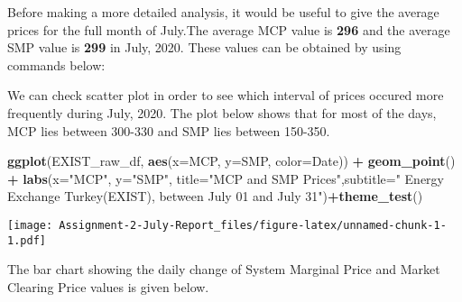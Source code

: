\documentclass[
]{article}
\newenvironment{Shaded}{\begin{snugshade}}{\end{snugshade}}
\newcommand{\DataTypeTok}[1]{\textcolor[rgb]{0.13,0.29,0.53}{#1}}
\newcommand{\KeywordTok}[1]{\textcolor[rgb]{0.13,0.29,0.53}{\textbf{#1}}}
\newcommand{\NormalTok}[1]{#1}
\newcommand{\OperatorTok}[1]{\textcolor[rgb]{0.81,0.36,0.00}{\textbf{#1}}}
\newcommand{\StringTok}[1]{\textcolor[rgb]{0.31,0.60,0.02}{#1}}
\begin{document}
Before making a more detailed analysis, it would be useful to give the
average prices for the full month of July.The average MCP value is
\textbf{296} and the average SMP value is \textbf{299} in July, 2020.
These values can be obtained by using commands below:

\begin{Shaded}
\end{Shaded}

We can check scatter plot in order to see which interval of prices
occured more frequently during July, 2020. The plot below shows that for
most of the days, MCP lies between 300-330 and SMP lies between 150-350.

\begin{Shaded}
\begin{Highlighting}[]
\KeywordTok{ggplot}\NormalTok{(EXIST\_raw\_df, }\KeywordTok{aes}\NormalTok{(}\DataTypeTok{x=}\NormalTok{MCP, }\DataTypeTok{y=}\NormalTok{SMP, }\DataTypeTok{color=}\NormalTok{Date)) }\OperatorTok{+}\StringTok{ }\KeywordTok{geom\_point}\NormalTok{() }\OperatorTok{+}\StringTok{  }\KeywordTok{labs}\NormalTok{(}\DataTypeTok{x=}\StringTok{"MCP"}\NormalTok{, }\DataTypeTok{y=}\StringTok{"SMP"}\NormalTok{,  }\DataTypeTok{title=}\StringTok{"MCP and SMP Prices"}\NormalTok{,}\DataTypeTok{subtitle=}\StringTok{" Energy Exchange Turkey(EXIST), between July 01 and July 31"}\NormalTok{)}\OperatorTok{+}\KeywordTok{theme\_test}\NormalTok{()}
\end{Highlighting}
\end{Shaded}

\texttt{[image: Assignment-2-July-Report\_files/figure-latex/unnamed-chunk-1-1.pdf]}

The bar chart showing the daily change of System Marginal Price and
Market Clearing Price values is given below.
\end{document}
